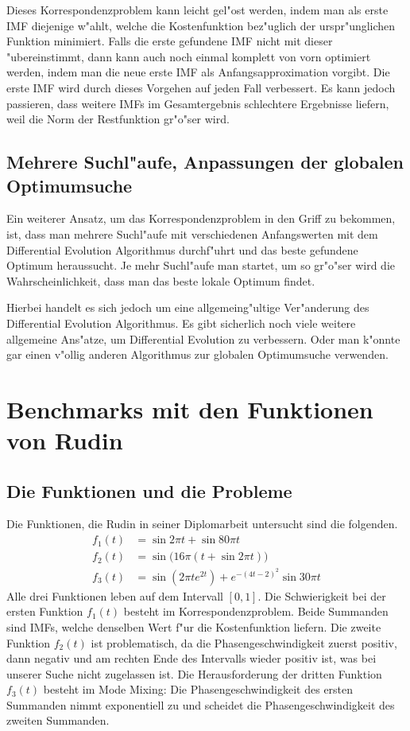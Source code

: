 \documentclass[a4paper]{scrartcl}
\begin{document}
Dieses Korrespondenzproblem kann leicht gel"ost werden, indem man als erste IMF diejenige w"ahlt, welche die Kostenfunktion bez"uglich der urspr"unglichen Funktion minimiert. Falls die erste gefundene IMF nicht mit dieser "ubereinstimmt, dann kann auch noch einmal komplett von vorn optimiert werden, indem man die neue erste IMF als Anfangsapproximation vorgibt. Die erste IMF wird durch dieses Vorgehen auf jeden Fall verbessert. Es kann jedoch passieren, dass weitere IMFs im Gesamtergebnis schlechtere Ergebnisse liefern, weil die Norm der Restfunktion gr"o"ser wird.


\subsection{Mehrere Suchl"aufe, Anpassungen der globalen Optimumsuche} \label{sec:aormchsogz}

Ein weiterer Ansatz, um das Korrespondenzproblem in den Griff zu bekommen, ist, dass man mehrere Suchl"aufe mit verschiedenen Anfangswerten mit dem Differential Evolution Algorithmus durchf"uhrt und das beste gefundene Optimum heraussucht. Je mehr Suchl"aufe man startet, um so gr"o"ser wird die Wahrscheinlichkeit, dass man das beste lokale Optimum findet. 

Hierbei handelt es sich jedoch um eine allgemeing"ultige Ver"anderung des Differential Evolution Algorithmus. Es gibt sicherlich noch viele weitere allgemeine Ans"atze, um Differential Evolution zu verbessern. Oder man k"onnte gar einen v"ollig anderen Algorithmus zur globalen Optimumsuche verwenden. 


\section{Benchmarks mit den Funktionen von Rudin}

\subsection{Die Funktionen und die Probleme}

Die Funktionen, die Rudin in seiner Diplomarbeit untersucht sind die folgenden.
\begin{align*}
f_1(t) &= \sin 2\pi t + \sin 80\pi t \\
f_2(t) &= \sin\big(16\pi(t+\sin 2\pi t)\big) \\
f_3(t) &= \sin(2\pi te^{2t}) + e^{-(4t-2)^2}\sin 30\pi t
\end{align*}
Alle drei Funktionen leben auf dem Intervall $[0,1]$. Die Schwierigkeit bei der ersten Funktion $f_1(t)$ besteht im Korrespondenzproblem. Beide Summanden sind IMFs, welche denselben Wert f"ur die Kostenfunktion liefern. Die zweite Funktion $f_2(t)$ ist problematisch, da die Phasengeschwindigkeit zuerst positiv, dann negativ und am rechten Ende des Intervalls wieder positiv ist, was bei unserer Suche nicht zugelassen ist. Die Herausforderung der dritten Funktion $f_3(t)$ besteht im Mode Mixing: Die Phasengeschwindigkeit des ersten Summanden nimmt exponentiell zu und scheidet die Phasengeschwindigkeit des zweiten Summanden. 
\end{document}
